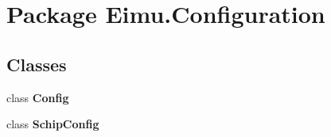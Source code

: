 \hypertarget{namespace_eimu_1_1_configuration}{
\section{Package Eimu.Configuration}
\label{namespace_eimu_1_1_configuration}
}
\subsection*{Classes}
\begin{DoxyCompactItemize}
\item 
class {\bfseries Config}
\item 
class {\bfseries SchipConfig}
\end{DoxyCompactItemize}

